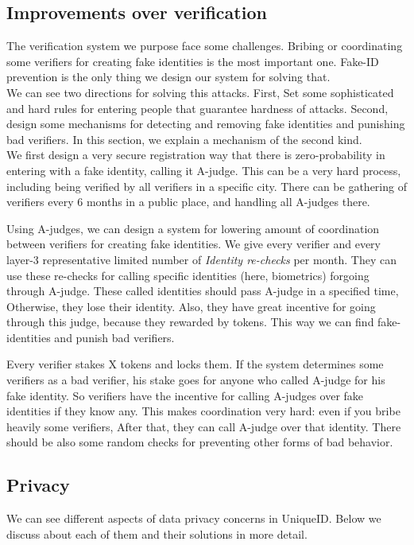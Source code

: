 \documentclass[conference]{IEEEtran}
\begin{document}
\subsection{Improvements over verification}
The verification system we purpose face some challenges. Bribing or coordinating some verifiers for creating fake identities is the most important one. Fake-ID prevention is the only thing we design our system for solving that. \\
We can see two directions for solving this attacks. First, Set some sophisticated and hard rules for entering people that guarantee hardness of attacks. Second, design some mechanisms for detecting and removing fake identities and punishing bad verifiers. In this section, we explain a mechanism of the second kind. \\
We first design a very secure registration way that there is zero-probability in entering with a fake identity, calling it A-judge. This can be a very hard process, including being verified by all verifiers in a specific city. There can be gathering of verifiers every 6 months in a public place, and handling all A-judges there.


Using A-judges, we can design a system for lowering amount of coordination between verifiers for creating fake identities. We give every verifier and every layer-3 representative limited number of \textit{Identity re-checks} per month. They can use these re-checks for calling specific identities (here, biometrics) forgoing through A-judge. These called identities should pass A-judge in a specified time, Otherwise, they lose their identity. Also, they have great incentive for going through this judge, because they rewarded by tokens. This way we can find fake-identities and punish bad verifiers.


Every verifier stakes X tokens and locks them. If the system determines some verifiers as a bad verifier, his stake goes for anyone who called A-judge for his fake identity. So verifiers have the incentive for calling A-judges over fake identities if they know any. This makes coordination very hard: even if you bribe heavily some verifiers, After that, they can call A-judge over that identity. There should be also some random checks for preventing other forms of bad behavior.

\subsection{Privacy}
We can see different aspects of data privacy concerns in UniqueID. Below we discuss about each of them and their solutions in more detail.
\end{document}
